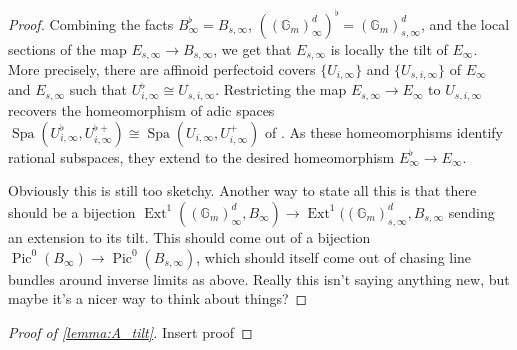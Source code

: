 \documentclass[11pt,oneside]{amsart}
\theoremstyle{theorem}
\theoremstyle{definition}
\theoremstyle{remark}
\begin{document}
\begin{proof}
Combining the facts $B_\infty^\flat=B_{s,\infty}$, $((\mathbb G_m)^d_{\infty})^\flat=(\mathbb G_m)^d_{s,\infty}$, and the local sections of the map $E_{s,\infty}\rightarrow B_{s,\infty}$, we get that $E_{s,\infty}$ is locally the tilt of $E_\infty$. More precisely, there are affinoid perfectoid covers $\{U_{i,\infty}\}$ and $\{U_{s,i,\infty}\}$ of $E_\infty$ and $E_{s,\infty}$ such that $U_{i,\infty}^\flat\cong U_{s,i,\infty}$. Restricting the map $E_{s,\infty}\rightarrow E_\infty$ to $U_{s,i,\infty}$ recovers the homeomorphism of adic spaces $\operatorname{Spa}(U_{i,\infty}^\flat,U_{i,\infty}^{\flat+})\cong \operatorname{Spa}(U_{i,\infty},U_{i,\infty}^+)$ of \cite[Theorem 2.5.1]{Kedlaya}. As these homeomorphisms identify rational subspaces, they extend to the desired homeomorphism $E_\infty^\flat\rightarrow E_\infty$.

{\color{purple} Obviously this is still too sketchy. Another way to state all this is that there should be a bijection $\operatorname{Ext}^1((\mathbb G_m)^d_\infty,B_\infty)\rightarrow \operatorname{Ext}^1((\mathbb G_m)^d_{s,\infty},B_{s,\infty}$ sending an extension to its tilt. This should come out of a bijection $\operatorname{Pic}^0(B_\infty)\rightarrow\operatorname{Pic}^0(B_{s,\infty})$, which should itself come out of chasing line bundles around inverse limits as above. Really this isn't saying anything new, but maybe it's a nicer way to think about things?}
\end{proof}

\begin{proof}[Proof of \ref{lemma:A_tilt}]
{\color{purple} Insert proof}
\end{proof}

\newpage
\end{document}
